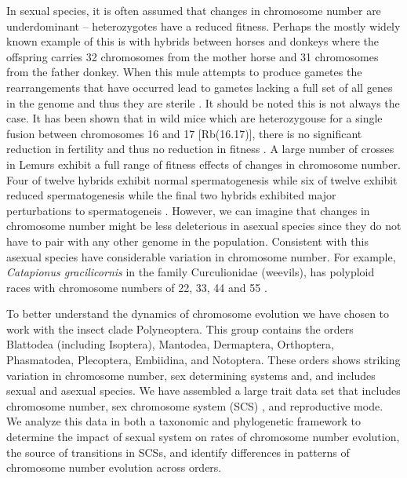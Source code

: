 In sexual species, it is often assumed that changes in chromosome number are underdominant \citep{white1973} -- heterozygotes have a reduced fitness. 
Perhaps the mostly widely known example of this is with hybrids between horses and donkeys where the offspring carries 32 chromosomes from the mother horse and 31 chromosomes from the father donkey. 
When this mule attempts to produce gametes the rearrangements that have occurred lead to gametes lacking a full set of all genes in the genome and thus they are sterile \citep{wodsedalek1916}. 
It should be noted this is not always the case.
It has been shown that in wild mice which are heterozygouse for a single fusion between chromosomes 16 and 17 [Rb(16.17)], there is no significant reduction in fertility and thus no reduction in fitness \citep{britton1990robertsonian}.
A large number of crosses in Lemurs exhibit a full range of fitness effects of changes in chromosome number.
Four of twelve hybrids exhibit normal spermatogenesis while six of twelve exhibit reduced spermatogenesis while the final two hybrids exhibited major perturbations to spermatogeneis \citep{ratomponirina1988}.   
However, we can imagine that changes in chromosome number might be less deleterious in asexual species since they do not have to pair with any other genome in the population.
Consistent with this asexual species have considerable variation in chromosome number. 
For example, \textit{Catapionus gracilicornis} in the family Curculionidae (weevils), has polyploid races with chromosome numbers of 22, 33, 44 and 55 \citep{lachowska1998}. 

To better understand the dynamics of chromosome evolution we have chosen to work with the insect clade Polyneoptera.
This group contains the orders Blattodea (including Isoptera), Mantodea, Dermaptera, Orthoptera, Phasmatodea, Plecoptera, Embiidina, and Notoptera.
These orders shows striking variation in chromosome number, sex determining systems and, and includes sexual and asexual species. 
We have assembled a large trait data set that includes chromosome number, sex chromosome system (SCS) , and reproductive mode.
We analyze this data in both a taxonomic and phylogenetic framework to determine the impact of sexual system on rates of chromosome number evolution, the source of transitions in SCSs, and identify differences in patterns of chromosome number evolution across orders.
 
